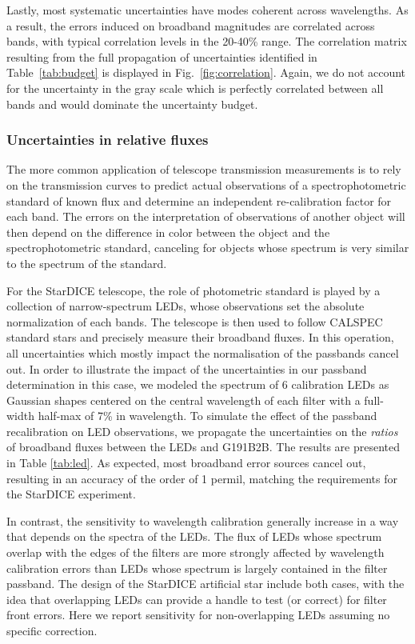Lastly, most systematic uncertainties have modes coherent across
wavelengths. As a result, the errors induced on broadband magnitudes
are correlated across bands, with typical correlation levels in the
20-40\% range. The correlation matrix resulting from the full
propagation of uncertainties identified in Table~\ref{tab:budget} is
displayed in Fig.~\ref{fig:correlation}. Again, we do not account for
the uncertainty in the gray scale which is perfectly correlated
between all bands and would dominate the uncertainty budget.

\subsubsection{Uncertainties in relative fluxes}
\label{sec:relative}

The more common application of telescope transmission measurements is
to rely on the transmission curves to predict actual
observations of a spectrophotometric standard of known flux and
determine an independent re-calibration factor for each band. The
errors on the interpretation of observations of another object will
then depend on the difference in color between the object and the
spectrophotometric standard, canceling for objects whose spectrum is
very similar to the spectrum of the standard.

For the StarDICE telescope, the role of photometric standard is played
by a collection of narrow-spectrum LEDs, whose observations set the
absolute normalization of each bands. The telescope is then used to
follow CALSPEC standard stars and precisely measure their broadband
fluxes. In this operation, all uncertainties which mostly impact the
normalisation of the passbands cancel out. In order to illustrate the
impact of the uncertainties in our passband determination in this
case, we modeled the spectrum of 6 calibration LEDs as Gaussian shapes
centered on the central wavelength of each filter with a full-width
half-max of 7\% in wavelength. 
To simulate the effect of the passband recalibration on LED
observations, we propagate the uncertainties on the \emph{ratios} of
broadband fluxes between the LEDs and G191B2B. The results are
presented in Table \ref{tab:led}. As expected, most broadband error
sources cancel out, resulting in an accuracy of the order of 1 permil,
matching the requirements for the StarDICE experiment.

In contrast, the sensitivity to wavelength calibration generally
increase in a way that depends on the spectra of the LEDs. The flux of
LEDs whose spectrum overlap with the edges of the filters are more
strongly affected by wavelength calibration errors than LEDs whose
spectrum is largely contained in the filter passband. The design of
the StarDICE artificial star include both cases, with the idea that
overlapping LEDs can provide a handle to test (or correct) for filter
front errors. Here we report sensitivity for non-overlapping LEDs
assuming no specific correction.

